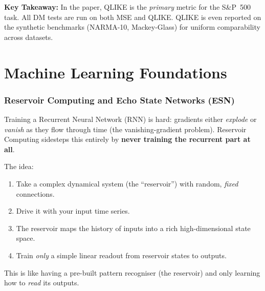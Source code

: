 \documentclass[11pt]{article}
\newcommand{\concept}[2]{%
  \begin{tcolorbox}[conceptbox, title={#1}]
  #2
  \end{tcolorbox}
}
\newcommand{\keypoint}[1]{%
  \begin{tcolorbox}[keybox]
  \textbf{Key Takeaway:} #1
  \end{tcolorbox}
}
\begin{document}
\keypoint{In the paper, QLIKE is the \emph{primary} metric for the S\&P~500
task. All DM tests are run on both MSE and QLIKE. QLIKE is even reported
on the synthetic benchmarks (NARMA-10, Mackey-Glass) for uniform comparability
across datasets.}

\clearpage
\part{Machine Learning Foundations}

\section{Reservoir Computing and Echo State Networks (ESN)}

\concept{Reservoir Computing --- The Big Idea}{
Training a Recurrent Neural Network (RNN) is hard: gradients either
\emph{explode} or \emph{vanish} as they flow through time (the
vanishing-gradient problem). Reservoir Computing sidesteps this entirely
by \textbf{never training the recurrent part at all}.

The idea:
\begin{enumerate}
  \item Take a complex dynamical system (the ``reservoir'') with random,
        \emph{fixed} connections.
  \item Drive it with your input time series.
  \item The reservoir maps the history of inputs into a rich
        high-dimensional state space.
  \item Train \emph{only} a simple linear readout from reservoir states
        to outputs.
\end{enumerate}
This is like having a pre-built pattern recogniser (the reservoir) and
only learning how to \emph{read} its outputs.
}
\end{document}
